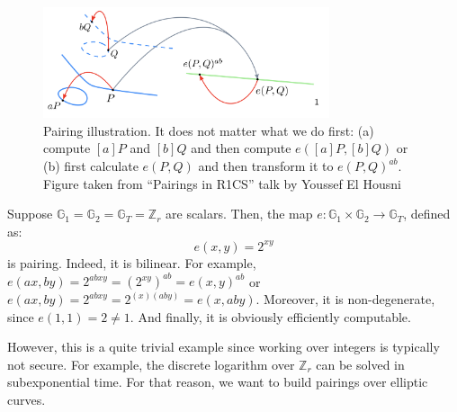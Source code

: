 \documentclass[../lecture-notes.tex]{subfiles}
\begin{document}
\begin{figure}[H]
    \centering
    \includegraphics[width=0.75\textwidth]{images/lecture_4/pairing.png}
    \caption{Pairing illustration. It does not matter what we do first: (a) compute $[a]P$ and $[b]Q$ and then compute $e([a]P,[b]Q)$ or (b) first calculate $e(P,Q)$ and then transform it to $e(P,Q)^{ab}$. \small{Figure taken from ``Pairings in R1CS'' talk by Youssef El Housni}}
    \label{fig:ecpairing}
\end{figure}

\begin{example}
    Suppose $\mathbb{G}_1=\mathbb{G}_2=\mathbb{G}_T=\mathbb{Z}_r$ are scalars. Then, the map $e: \mathbb{G}_1 \times \mathbb{G}_2 \to \mathbb{G}_T$, defined as:
    \begin{equation*}
        e(x,y)= 2^{xy}
    \end{equation*}
    is pairing. Indeed, it is bilinear. For example, $e(ax,by) = 2^{abxy} = (2^{xy})^{ab} = e(x,y)^{ab}$ or $e(ax,by)=2^{abxy}=2^{(x)(aby)}=e(x,aby)$. Moreover, it is non-degenerate, since $e(1,1)=2 \neq 1$. And finally, it is obviously efficiently computable.

    However, this is a quite trivial example since working over integers is typically not secure. For example, the discrete logarithm over $\mathbb{Z}_r$ can be solved in subexponential time. For that reason, we want to build pairings over elliptic curves.
\end{example}
\end{document}
